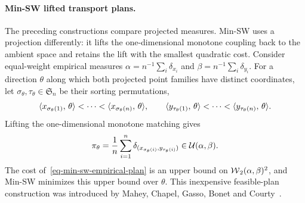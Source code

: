 \paragraph{Min-SW lifted transport plans.}

The preceding constructions compare projected measures. Min-SW uses a projection differently: it lifts the one-dimensional monotone coupling back to the ambient space and retains the lift with the smallest quadratic cost. Consider equal-weight empirical measures
$\alpha=n^{-1}\sum_i\delta_{x_i}$ and $\beta=n^{-1}\sum_i\delta_{y_i}$.
For a direction $\theta$ along which both projected point families have distinct coordinates, let $\sigma_\theta,\tau_\theta\in\mathfrak S_n$ be their sorting permutations,
\[
	\langle x_{\sigma_\theta(1)},\,\theta\rangle<\cdots<
	\langle x_{\sigma_\theta(n)},\,\theta\rangle,
	\qquad
	\langle y_{\tau_\theta(1)},\,\theta\rangle<\cdots<
	\langle y_{\tau_\theta(n)},\,\theta\rangle.
\]
Lifting the one-dimensional monotone matching gives
\begin{equation}\label{eq-min-sw-empirical-plan}
	\pi_\theta
	=
	\frac1n\sum_{i=1}^n
	\delta_{(x_{\sigma_\theta(i)},y_{\tau_\theta(i)})}
	\in\mathcal{U}(\alpha,\beta).
\end{equation}
The cost of~\eqref{eq-min-sw-empirical-plan} is an upper bound on $\operatorname{\mathcal{W}}_2(\alpha,\beta)^2$, and Min-SW minimizes this upper bound over $\theta$. This inexpensive feasible-plan construction was introduced by Mahey, Chapel, Gasso, Bonet and Courty~\cite{MaheyChapelGassoBonetCourty2023MinSW}.

